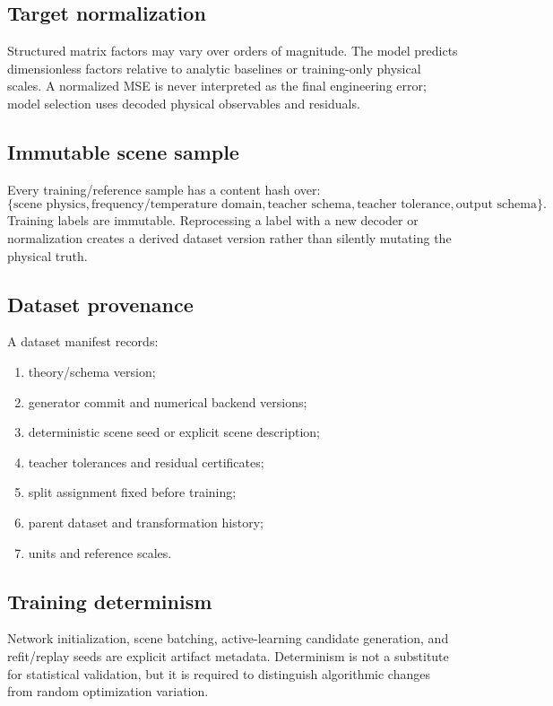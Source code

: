 \subsection{Target normalization}

Structured matrix factors may vary over orders of magnitude. The model predicts
dimensionless factors relative to analytic baselines or training-only physical
scales. A normalized MSE is never interpreted as the final engineering error;
model selection uses decoded physical observables and residuals.

\subsection{Immutable scene sample}

Every training/reference sample has a content hash over:
\[
 \{\text{scene physics},
   \text{frequency/temperature domain},
   \text{teacher schema},
   \text{teacher tolerance},
   \text{output schema}\}.
\]
Training labels are immutable. Reprocessing a label with a new decoder or
normalization creates a derived dataset version rather than silently mutating
the physical truth.

\subsection{Dataset provenance}

A dataset manifest records:
\begin{enumerate}
\item theory/schema version;
\item generator commit and numerical backend versions;
\item deterministic scene seed or explicit scene description;
\item teacher tolerances and residual certificates;
\item split assignment fixed before training;
\item parent dataset and transformation history;
\item units and reference scales.
\end{enumerate}

\subsection{Training determinism}

Network initialization, scene batching, active-learning candidate generation,
and refit/replay seeds are explicit artifact metadata. Determinism is not a
substitute for statistical validation, but it is required to distinguish
algorithmic changes from random optimization variation.
